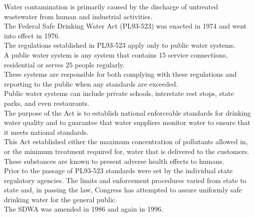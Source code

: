 \documentclass{article}
\begin{document}
Water contamination is primarily caused by the discharge of untreated wastewater from human and industrial activities.\\



The Federal Safe Drinking Water Act (PL93-523) was enacted in 1974 and went into effect in 1976. \\
The regulations established in PL93-523 apply only to public water systems.\\
A public water system is any system that contains 15 service connections, residential or serves 25 people regularly. \\
These  systems are responsible for both complying with these regulations and reporting to the public when any standards are exceeded. \\
Public water systems can include private schools, interstate rest stops, state parks, and even restaurants.\\
The purpose of the Act is to establish national enforceable standards for
drinking water quality and to guarantee that water suppliers monitor water to ensure that it meets national standards. \\
This Act established either the maximum concentration of pollutants allowed in, or the minimum treatment required for, water that is delivered to the customers. These substances are known to present adverse health effects to
humans. \\

Prior to the passage of PL93-523 standards were set by the individual state regulatory agencies. The limits and enforcement procedures varied from state to state and, in passing the law, Congress has attempted to assure uniformly safe drinking water for the general public. \\

The SDWA was amended in 1986 and again in 1996.\\
\end{document}
